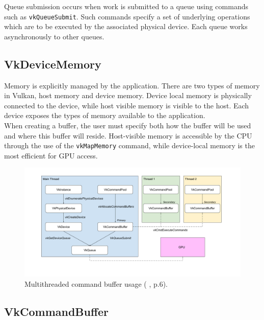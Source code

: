 \documentclass[12pt]{report}
\newcommand{\citediagram}[2]{(\citeauthor{#1} \citeyear{#1}, p.#2)}
\theoremstyle{definition}
\begin{document}
        Queue submission occurs when work is submitted to a queue using commands
        such as \texttt{vkQueueSubmit}. Such commands specify a set of underlying
        operations which are to be executed by the associated physical
        device. Each queue works asynchronously to other queues.

      \subsection{VkDeviceMemory}

        Memory is explicitly managed by the application. There are two types of
        memory in Vulkan, host memory and device memory. Device local memory is
        physically connected to the device, while host visible memory is
        visible to the host. Each device exposes the types of memory available
        to the application. \\

        When creating a buffer, the user must specify both how the buffer will
        be used and where this buffer will reside. Host-visible memory is
        accessible by the CPU through the use of the \texttt{vkMapMemory} command, while
        device-local memory is the most efficient for GPU access.

      \begin{figure}[h]
        \centering
        \includegraphics[width=\textwidth]{images/pi_hierarchy.png}
        \caption{Multithreaded command buffer usage \citediagram{personalinquiry}{6}.}
        \label{fig:command_buffer}  
      \end{figure}

      \subsection{VkCommandBuffer}
\end{document}
